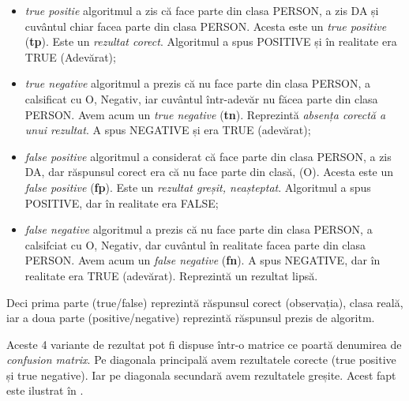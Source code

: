 
\begin{itemize}
\item \textit{true positie} algoritmul a zis că face parte din clasa PERSON, a zis DA și cuvântul chiar facea parte din clasa PERSON. Acesta este un \textit{true positive} (\textbf{tp}). Este un \textit{rezultat corect}. Algoritmul a spus POSITIVE și în realitate era TRUE (Adevărat);

\item \textit{true negative} algoritmul a prezis că nu face parte din clasa PERSON, a calsificat cu O, Negativ, iar cuvântul într-adevăr nu făcea parte din clasa PERSON. Avem acum un \textit{true negative} (\textbf{tn}). Reprezintă \textit{absența corectă a unui rezultat}. A spus NEGATIVE și era TRUE (adevărat);

\item \textit{false positive} algoritmul a considerat că face parte din clasa PERSON, a zis DA, dar răspunsul corect era că nu face parte din clasă, (O). Acesta este un \textit{false positive} (\textbf{fp}). Este un \textit{rezultat greșit, neașteptat}. Algoritmul a spus POSITIVE, dar în realitate era FALSE;

\item \textit{false negative} algoritmul a prezis că nu face parte din clasa PERSON, a calsifciat cu O, Negativ, dar cuvântul în realitate facea parte din clasa PERSON. Avem acum un \textit{false negative} (\textbf{fn}). A spus NEGATIVE, dar în realitate era TRUE (adevărat). Reprezintă un rezultat lipsă.

\end{itemize}

Deci prima parte (true/false) reprezintă răspunsul corect (observația), clasa reală, iar a doua parte (positive/negative) reprezintă răspunsul prezis de algoritm.

Aceste 4 variante de rezultat pot fi dispuse într-o matrice ce poartă denumirea de \textit{confusion matrix}. Pe diagonala principală avem rezultatele corecte (true positive și true negative). Iar pe diagonala secundară avem rezultatele greșite. Acest fapt este ilustrat în .


